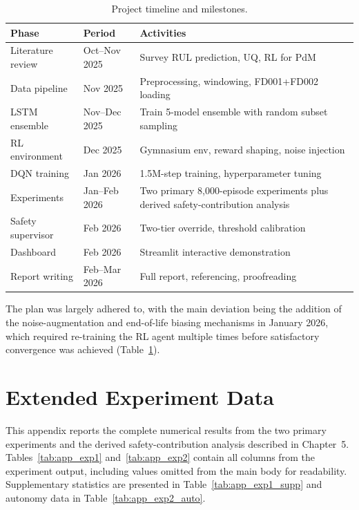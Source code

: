 \documentclass[12pt,a4paper]{report}
\begin{document}
\begin{table}[h]
\centering
\caption{Project timeline and milestones.}
\label{tab:timeline}
\begin{tabularx}{\textwidth}{@{}l l X@{}}
\toprule
\textbf{Phase} & \textbf{Period} & \textbf{Activities} \\
\midrule
Literature review & Oct--Nov 2025 & Survey RUL prediction, UQ, RL for PdM \\
Data pipeline & Nov 2025 & Preprocessing, windowing, FD001+FD002 loading \\
LSTM ensemble & Nov--Dec 2025 & Train 5-model ensemble with random subset sampling \\
RL environment & Dec 2025 & Gymnasium env, reward shaping, noise injection \\
DQN training & Jan 2026 & 1.5M-step training, hyperparameter tuning \\
Experiments & Jan--Feb 2026 & Two primary 8,000-episode experiments plus derived safety-contribution analysis \\
Safety supervisor & Feb 2026 & Two-tier override, threshold calibration \\
Dashboard & Feb 2026 & Streamlit interactive demonstration \\
Report writing & Feb--Mar 2026 & Full report, referencing, proofreading \\
\bottomrule
\end{tabularx}
\end{table}

The plan was largely adhered to, with the main deviation being the addition of the noise-augmentation and end-of-life biasing mechanisms in January 2026, which required re-training the RL agent multiple times before satisfactory convergence was achieved (Table~\ref{tab:timeline}).



\chapter{Extended Experiment Data}
\label{app:experiment_data}

This appendix reports the complete numerical results from the two primary experiments and the derived safety-contribution analysis described in Chapter~5. Tables~\ref{tab:app_exp1} and~\ref{tab:app_exp2} contain all columns from the experiment output, including values omitted from the main body for readability. Supplementary statistics are presented in Table~\ref{tab:app_exp1_supp} and autonomy data in Table~\ref{tab:app_exp2_auto}.
\end{document}
